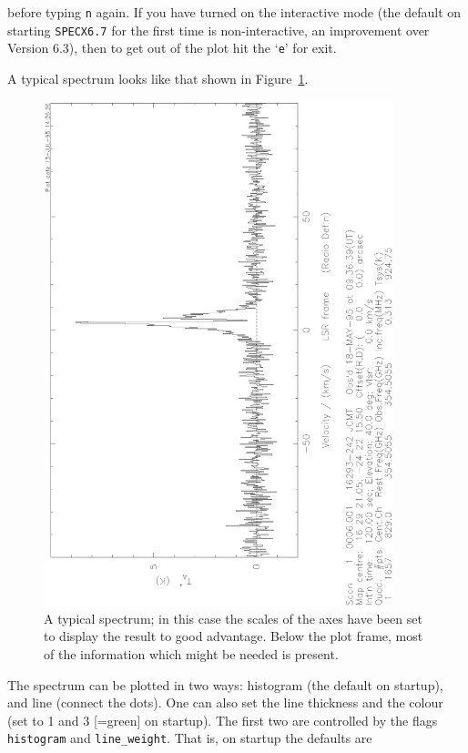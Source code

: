 \documentclass[11pt,twoside]{article}
\newcommand{\SPECX}{{\tt SPECX}}
\begin{document}
before typing {\tt n} again. If you have turned on the interactive
mode (the default on starting \SPECX {\tt 6.7} for the first time is
non-interactive, an improvement over Version 6.3), then to get out of
the plot hit the `{\tt{e}}' for exit.

A typical spectrum looks like that shown in
Figure~\ref{fig:specx_plot}.
%
\begin{figure}[htb]
\centering
\includegraphics[angle=-90,width=4in]{sc8_spectrum.ps}
\vspace*{-0.5cm}
\begin{center}
\begin{minipage}[t]{5in}
\caption[A typical plot]
{\small{A typical spectrum; in this case the scales of the axes have
been set to display the result to good advantage. Below the plot
frame, most of the information which might be needed is present.}  }
\label{fig:specx_plot}
\end{minipage}
\end{center}
\end{figure}

The spectrum can be plotted in two ways: histogram (the default on
startup), and line (connect the dots). One can also set the line
thickness and the colour (set to 1 and 3 [=green] on startup).
The first two are controlled by the flags
{\tt histogram} and {\tt line\_weight}. That is, on startup the
defaults are
\end{document}
